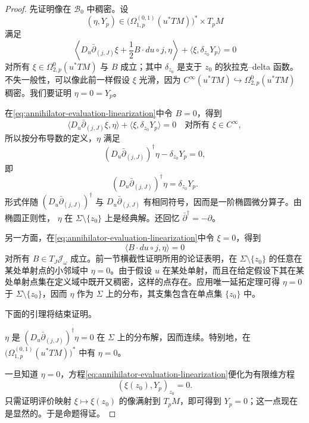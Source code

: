 \begin{proof}
先证明像在 $\mathcal B_0$ 中稠密。设
\[
 (\eta,Y_p)\in
 \bigl(\Omega_{1,p}^{(0,1)}(u^*TM)\bigr)^*\times T_pM
\]
满足
\begin{equation}
 \left\langle D_u\bar\partial_{(j,J)}\xi+
 \frac12B\cdot du\circ j,\eta\right\rangle
 +\langle\xi,\delta_{z_0}Y_p\rangle=0
 \label{eq:annihilator-evaluation-linearization}
\end{equation}
对所有 $\xi\in\Omega_{2,p}^0(u^*TM)$ 与 $B$ 成立；其中
$\delta_{z_0}$ 是支于 $z_0$ 的狄拉克--delta 函数。不失一般性，可以像此前一样假设
$\xi$ 光滑，因为
$C^\infty(u^*TM)\hookrightarrow\Omega_{2,p}^0(u^*TM)$ 稠密。我们要证明
$\eta=0=Y_p$。

在\eqref{eq:annihilator-evaluation-linearization}中令 $B=0$，得到
\begin{equation}
 \langle D_u\bar\partial_{(j,J)}\xi,\eta\rangle
 +\langle\xi,\delta_{z_0}Y_p\rangle=0
 \quad\text{对所有 }\xi\in C^\infty,
 \label{eq:distribution-adjoint-with-delta}
\end{equation}
所以按分布导数的定义，$\eta$ 满足
\[
 (D_u\bar\partial_{(j,J)})^\dagger\eta-\delta_{z_0}Y_p=0,
\]
即
\[
 (D_u\bar\partial_{(j,J)})^\dagger\eta=\delta_{z_0}Y_p.
\]
形式伴随 $(D_u\bar\partial_{(j,J)})^\dagger$ 与
$D_u\bar\partial_{(j,J)}$ 有相同符号，因而是一阶椭圆微分算子。由椭圆正则性，
$\eta$ 在 $\Sigma\setminus\{z_0\}$ 上是经典解。还回忆
$\bar\partial^\dagger=-\partial$。

另一方面，在\eqref{eq:annihilator-evaluation-linearization}中令 $\xi=0$，得到
\begin{equation}
 \langle B\cdot du\circ j,\eta\rangle=0
 \label{eq:annihilator-almost-complex-evaluation}
\end{equation}
对所有 $B\in T_J\mathcal J_\omega$ 成立。前一节横截性证明所用的论证表明，在
$\Sigma\setminus\{z_0\}$ 的任意在某处单射点的小邻域中 $\eta=0$。由于假设
$u$ 在某处单射，而且在给定假设下其在某处单射点集在定义域中既开又稠密，这样的点存在。应用唯一延拓定理可得
$\eta=0$ 于 $\Sigma\setminus\{z_0\}$，因而 $\eta$ 作为 $\Sigma$ 上的分布，其支集包含在单点集
$\{z_0\}$ 中。

下面的引理将结束证明。

\begin{lemma}\label{lem:distributional-adjoint-continuous}
$\eta$ 是 $(D_u\bar\partial_{(j,J)})^\dagger\eta=0$ 在
$\Sigma$ 上的分布解，因而连续。特别地，在
$\bigl(\Omega_{1,p}^{(0,1)}(u^*TM)\bigr)^*$ 中有 $\eta=0$。
\end{lemma}

一旦知道 $\eta=0$，方程\eqref{eq:annihilator-evaluation-linearization}便化为有限维方程
\begin{equation}
 (\xi(z_0),Y_p)_{z_0}=0.
 \label{eq:finite-dimensional-evaluation-annihilator}
\end{equation}
只需证明评价映射 $\xi\mapsto\xi(z_0)$ 的像满射到 $T_pM$，即可得到
$Y_p=0$；这一点现在是显然的。于是命题得证。


\end{proof}
